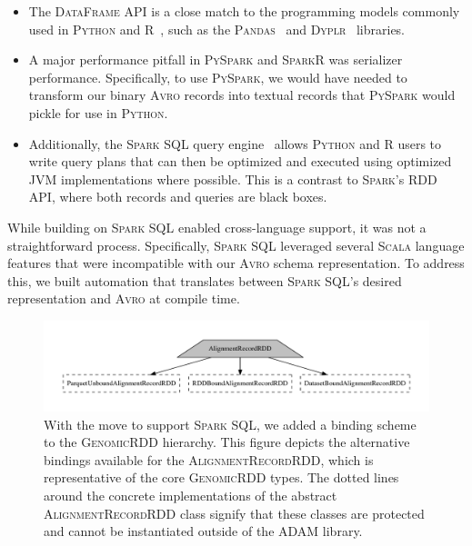 \documentclass[phd]{ucbthesis}
\begin{document}
\begin{itemize}
\item The \textsc{DataFrame} API is a close match to the programming models
  commonly used in \textsc{Python} and R~\cite{armbrust15}, such as the
  \textsc{Pandas}~\cite{mckinney10} and \textsc{Dyplr}~\cite{wickham15} libraries.
\item A major performance pitfall in \textsc{PySpark} and \textsc{SparkR} was
  serializer performance. Specifically, to use \textsc{PySpark}, we would have
  needed to transform our binary \textsc{Avro} records into textual records that
  \textsc{PySpark} would pickle for use in \textsc{Python}.
\item Additionally, the \textsc{Spark SQL} query engine~\cite{armbrust15} allows
  \textsc{Python} and R users to write query plans that can then be optimized
  and executed using optimized JVM implementations where possible. This is a
  contrast to \textsc{Spark}'s RDD API, where both records and queries are black
  boxes.
\end{itemize}

While building on \textsc{Spark SQL} enabled cross-language support, it was not
a straightforward process. Specifically, \textsc{Spark SQL} leveraged several
\textsc{Scala} language features that were incompatible with our \textsc{Avro}
schema representation. To address this, we built automation that translates
between \textsc{Spark SQL}'s desired representation and \textsc{Avro} at compile
time.

\begin{figure}[h]
\begin{center}
\includegraphics[width=0.5\linewidth]{graphs/binding.pdf}
\end{center}
\caption{With the move to support \textsc{Spark SQL}, we added a binding scheme
  to the \textsc{GenomicRDD} hierarchy. This figure depicts the alternative
  bindings available for the \textsc{AlignmentRecordRDD}, which is
  representative of the core \textsc{GenomicRDD} types. The dotted lines around
  the concrete implementations of the abstract \textsc{AlignmentRecordRDD} class
  signify that these classes are protected and cannot be instantiated outside of
  the \textsc{ADAM} library.}
\label{fig:binding}
\end{figure}
\end{document}
